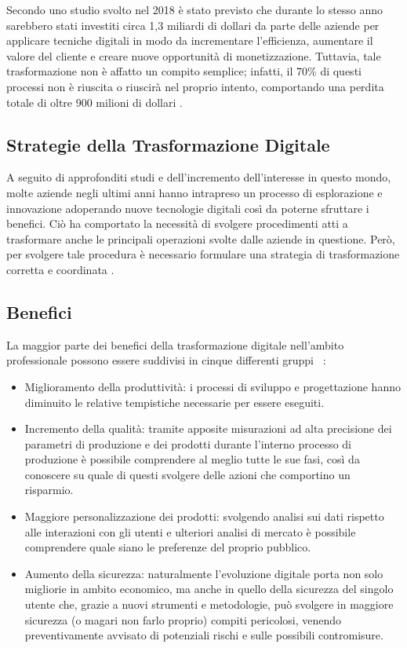 Secondo uno studio svolto nel 2018 è stato previsto che durante lo stesso anno sarebbero stati investiti circa 1,3 miliardi di dollari da parte delle aziende per applicare tecniche digitali in modo da incrementare l'efficienza, aumentare il valore del cliente e creare nuove opportunità di monetizzazione. Tuttavia, tale trasformazione non è affatto un compito semplice; infatti, il 70\% di questi processi non è riuscita o riuscirà nel proprio intento, comportando  una perdita totale di oltre 900 milioni di dollari \cite{forbes_digital_transformation_fail}.

\subsection{Strategie della Trasformazione Digitale}

A seguito di approfonditi studi e dell'incremento dell'interesse in questo mondo, molte aziende negli ultimi anni hanno intrapreso un processo di esplorazione e innovazione adoperando nuove tecnologie digitali così da poterne sfruttare i benefici. Ciò ha comportato la necessità di svolgere procedimenti atti a trasformare anche le principali operazioni svolte dalle aziende in questione. Però, per svolgere tale procedura è necessario formulare una strategia di trasformazione corretta e coordinata \cite{digital_transformation_strategies}.

\subsection{Benefici}

La maggior parte dei benefici della trasformazione digitale nell'ambito professionale possono essere suddivisi in cinque differenti gruppi ~\cite{sciencedirect_digital_transformation_benefits}:
\begin{itemize}
    \item Miglioramento della produttività: i processi di sviluppo e progettazione hanno diminuito le relative tempistiche necessarie per essere eseguiti.
    \item Incremento della qualità: tramite apposite misurazioni ad alta precisione dei parametri di produzione e dei prodotti durante l'interno processo di produzione è possibile comprendere al meglio tutte le sue fasi, così da conoscere su quale di questi svolgere delle azioni che comportino un risparmio.
    \item Maggiore personalizzazione dei prodotti: svolgendo analisi sui dati rispetto alle interazioni con gli utenti e ulteriori analisi di mercato è possibile comprendere quale siano le preferenze del proprio pubblico.
    \item Aumento della sicurezza: naturalmente l’evoluzione digitale porta non solo migliorie in ambito economico, ma anche in quello della sicurezza del singolo utente che, grazie a nuovi strumenti e metodologie, può svolgere in maggiore sicurezza (o magari non farlo proprio) compiti pericolosi, venendo preventivamente avvisato di potenziali rischi e sulle possibili contromisure.
\end{itemize}

